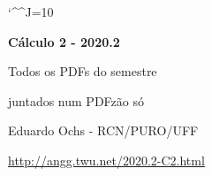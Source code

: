 \documentclass[oneside,12pt]{article}
\begin{document}

\def\drafturl{http://angg.twu.net/LATEX/2020-2-C2.pdf}
\def\drafturl{http://angg.twu.net/2020.2-C2.html}
\def\draftfooter{\tiny \href{\drafturl}{\jobname{}} \ColorBrown{\shorttoday{} \hours}}

\catcode`\^^J=10
\pu



%

\thispagestyle{empty}

\begin{center}

\vspace*{1.2cm}

{\bf \Large Cálculo 2 - 2020.2}

\bsk

Todos os PDFs do semestre

juntados num PDFzão só

\bsk

Eduardo Ochs - RCN/PURO/UFF

\url{http://angg.twu.net/2020.2-C2.html}

\end{center}

\newpage




\end{document}
